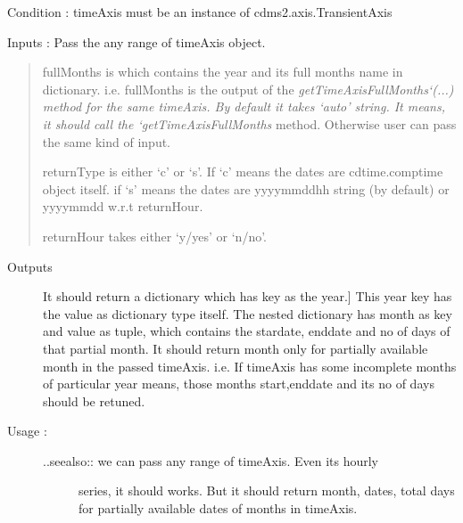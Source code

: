\documentclass[letterpaper,10pt,english]{sphinxmanual}
\begin{document}
\begin{fulllineitems}
\begin{fulllineitems}
Condition : timeAxis must be an instance of cdms2.axis.TransientAxis

Inputs : Pass the any range of timeAxis object.
\begin{quote}

fullMonths is which contains the year and its full months
name in dictionary. i.e. fullMonths is the output of the
\emph{getTimeAxisFullMonths{}`(...) method for the same timeAxis.
By default it takes `auto' string. It means, it should call
the {}`getTimeAxisFullMonths} method. Otherwise user can pass
the same kind of input.

returnType is either `c' or `s'. If `c' means the dates are
cdtime.comptime object itself. if `s' means the dates are
yyyymmddhh string (by default) or yyyymmdd w.r.t returnHour.

returnHour takes either `y/yes' or `n/no'.
\end{quote}
\begin{description}
\item[{Outputs}] \leavevmode{[}It should return a dictionary which has key as the year.{]}
This year key has the value as dictionary type itself.
The nested dictionary has month as key and
value as tuple, which contains the stardate, enddate and
no of days of that partial month.
It should return month only for partially available month
in the passed timeAxis.
i.e. If timeAxis has some incomplete months of particular
year means, those months start,enddate and its no of days
should be retuned.

\item[{Usage :}] \leavevmode\begin{description}
\item[{..seealso:: we can pass any range of timeAxis. Even its hourly}] \leavevmode
series, it should works. But it should return month,
dates, total days for partially available dates of
months in timeAxis.


\end{description}
\end{description}
\end{fulllineitems}
\end{fulllineitems}
\end{document}

